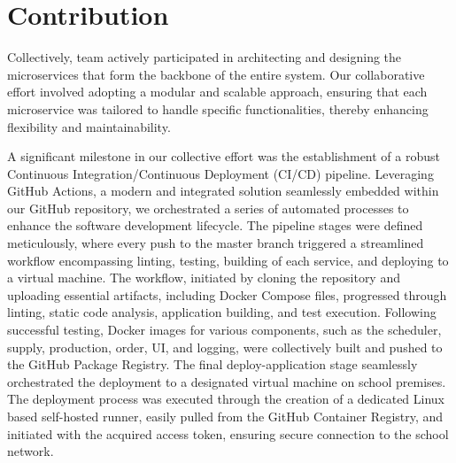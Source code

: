 \documentclass[conference, onecolumn]{IEEEtran}
\begin{document}


\maketitle
\IEEEpubidadjcol


\section{Contribution}


Collectively, team actively participated in architecting and designing the microservices that form the backbone of the entire system. Our collaborative effort involved adopting a modular and scalable approach, ensuring that each microservice was tailored to handle specific functionalities, thereby enhancing flexibility and maintainability.

A significant milestone in our collective effort was the establishment of a robust Continuous Integration/Continuous Deployment (CI/CD) pipeline. Leveraging GitHub Actions, a modern and integrated solution seamlessly embedded within our GitHub repository, we orchestrated a series of automated processes to enhance the software development lifecycle. The pipeline stages were defined meticulously, where every push to the master branch triggered a streamlined workflow encompassing linting, testing, building of each service, and deploying to a virtual machine. The workflow, initiated by cloning the repository and uploading essential artifacts, including Docker Compose files, progressed through linting, static code analysis, application building, and test execution. Following successful testing, Docker images for various components, such as the scheduler, supply, production, order, UI, and logging, were collectively built and pushed to the GitHub Package Registry. The final deploy-application stage seamlessly orchestrated the deployment to a designated virtual machine on school premises. The deployment process was executed through the creation of a dedicated Linux based self-hosted runner, easily pulled from the GitHub Container Registry, and initiated with the acquired access token, ensuring secure connection to the school network.
\end{document}
